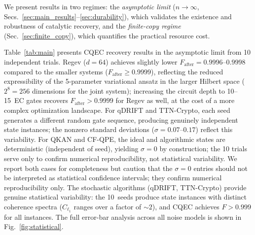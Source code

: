 \documentclass[prx,twocolumn,superscriptaddress,longbibliography,floatfix]{revtex4-2}
\begin{document}
We present results in two regimes: the \emph{asymptotic limit} ($n \to \infty$, Secs.~\ref{sec:main_results}--\ref{sec:durability}), which validates the existence and robustness of catalytic recovery, and the \emph{finite-copy regime} (Sec.~\ref{sec:finite_copy}), which quantifies the practical resource cost.

Table~\ref{tab:main} presents CQEC recovery results in the asymptotic limit from 10 independent trials.
Regev ($d = 64$) achieves slightly lower $F_\mathrm{after} = 0.9996$--$0.9998$ compared to the smaller systems ($F_\mathrm{after} \geq 0.9999$), reflecting the reduced expressibility of the 5-parameter variational ansatz in the larger Hilbert space ($2^8 = 256$ dimensions for the joint system); increasing the circuit depth to 10--15~EC gates recovers $F_\mathrm{after} > 0.9999$ for Regev as well, at the cost of a more complex optimization landscape.
For qDRIFT and TTN-Crypto, each seed generates a different random gate sequence, producing genuinely independent state instances; the nonzero standard deviations ($\sigma = 0.07$--$0.17$) reflect this variability.
For QKAN and CF-QPE, the ideal and algorithmic states are deterministic (independent of seed), yielding $\sigma = 0$ by construction; the 10 trials serve only to confirm numerical reproducibility, not statistical variability.
We report both cases for completeness but caution that the $\sigma = 0$ entries should not be interpreted as statistical confidence intervals; they confirm numerical reproducibility only.
The stochastic algorithms (qDRIFT, TTN-Crypto) provide genuine statistical variability: the 10~seeds produce state instances with distinct coherence spectra ($C_{\ell_1}$ ranges over a factor of ${\sim}2$), and CQEC achieves $F > 0.999$ for all instances.
The full error-bar analysis across all noise models is shown in Fig.~\ref{fig:statistical}.
\end{document}
